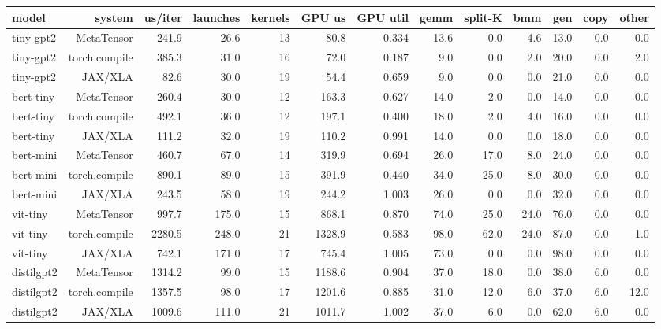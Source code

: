 \begin{tabular}{lrrrrrrrrrrrr}
\toprule
model & system & us/iter & launches & kernels & GPU us & GPU util & gemm & split-K & bmm & gen & copy & other \\
\midrule
tiny-gpt2 & MetaTensor & 241.9 & 26.6 & 13 & 80.8 & 0.334 & 13.6 & 0.0 & 4.6 & 13.0 & 0.0 & 0.0 \\
tiny-gpt2 & torch.compile & 385.3 & 31.0 & 16 & 72.0 & 0.187 & 9.0 & 0.0 & 2.0 & 20.0 & 0.0 & 2.0 \\
tiny-gpt2 & JAX/XLA & 82.6 & 30.0 & 19 & 54.4 & 0.659 & 9.0 & 0.0 & 0.0 & 21.0 & 0.0 & 0.0 \\
bert-tiny & MetaTensor & 260.4 & 30.0 & 12 & 163.3 & 0.627 & 14.0 & 2.0 & 0.0 & 14.0 & 0.0 & 0.0 \\
bert-tiny & torch.compile & 492.1 & 36.0 & 12 & 197.1 & 0.400 & 18.0 & 2.0 & 4.0 & 16.0 & 0.0 & 0.0 \\
bert-tiny & JAX/XLA & 111.2 & 32.0 & 19 & 110.2 & 0.991 & 14.0 & 0.0 & 0.0 & 18.0 & 0.0 & 0.0 \\
bert-mini & MetaTensor & 460.7 & 67.0 & 14 & 319.9 & 0.694 & 26.0 & 17.0 & 8.0 & 24.0 & 0.0 & 0.0 \\
bert-mini & torch.compile & 890.1 & 89.0 & 15 & 391.9 & 0.440 & 34.0 & 25.0 & 8.0 & 30.0 & 0.0 & 0.0 \\
bert-mini & JAX/XLA & 243.5 & 58.0 & 19 & 244.2 & 1.003 & 26.0 & 0.0 & 0.0 & 32.0 & 0.0 & 0.0 \\
vit-tiny & MetaTensor & 997.7 & 175.0 & 15 & 868.1 & 0.870 & 74.0 & 25.0 & 24.0 & 76.0 & 0.0 & 0.0 \\
vit-tiny & torch.compile & 2280.5 & 248.0 & 21 & 1328.9 & 0.583 & 98.0 & 62.0 & 24.0 & 87.0 & 0.0 & 1.0 \\
vit-tiny & JAX/XLA & 742.1 & 171.0 & 17 & 745.4 & 1.005 & 73.0 & 0.0 & 0.0 & 98.0 & 0.0 & 0.0 \\
distilgpt2 & MetaTensor & 1314.2 & 99.0 & 15 & 1188.6 & 0.904 & 37.0 & 18.0 & 0.0 & 38.0 & 6.0 & 0.0 \\
distilgpt2 & torch.compile & 1357.5 & 98.0 & 17 & 1201.6 & 0.885 & 31.0 & 12.0 & 6.0 & 37.0 & 6.0 & 12.0 \\
distilgpt2 & JAX/XLA & 1009.6 & 111.0 & 21 & 1011.7 & 1.002 & 37.0 & 6.0 & 0.0 & 62.0 & 6.0 & 0.0 \\
\bottomrule
\end{tabular}
